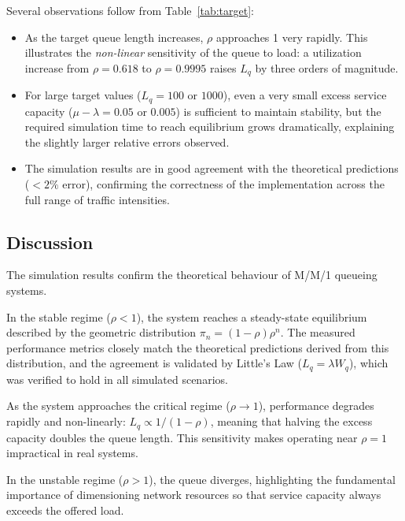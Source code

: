 \documentclass[12pt]{article}
\begin{document}
Several observations follow from Table~\ref{tab:target}:

\begin{itemize}
    \item As the target queue length increases, $\rho$ approaches 1 very rapidly. This illustrates the
          \emph{non-linear} sensitivity of the queue to load: a utilization increase from
          $\rho = 0.618$ to $\rho = 0.9995$ raises $L_q$ by three orders of magnitude.

    \item For large target values ($L_q = 100$ or $1000$), even a very small excess service
          capacity ($\mu - \lambda = 0.05$ or $0.005$) is sufficient to maintain stability, but the
          required simulation time to reach equilibrium grows dramatically, explaining the
          slightly larger relative errors observed.

    \item The simulation results are in good agreement with the theoretical predictions
          ($<2\%$ error), confirming the correctness of the implementation across the full
          range of traffic intensities.
\end{itemize}

\subsection{Discussion}

The simulation results confirm the theoretical behaviour of M/M/1 queueing systems.

In the stable regime ($\rho < 1$), the system reaches a steady-state equilibrium described
by the geometric distribution $\pi_n = (1-\rho)\rho^n$. The measured performance metrics
closely match the theoretical predictions derived from this distribution, and the agreement
is validated by Little's Law ($L_q = \lambda W_q$), which was verified to hold in all
simulated scenarios.

As the system approaches the critical regime ($\rho \to 1$), performance degrades rapidly
and non-linearly: $L_q \propto 1/(1-\rho)$, meaning that halving the excess capacity
doubles the queue length. This sensitivity makes operating near $\rho = 1$ impractical
in real systems.

In the unstable regime ($\rho > 1$), the queue diverges, highlighting the fundamental
importance of dimensioning network resources so that service capacity always exceeds
the offered load.
\end{document}

